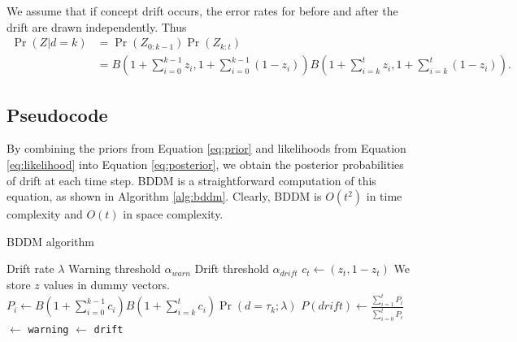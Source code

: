 We assume that if concept drift occurs, the error rates for before and after the drift are drawn independently. Thus
\begin{align}
  \Pr(Z|d=k) &= \Pr(Z_{0:k-1})\Pr(Z_{k:t}) \\
  &= B\left(1+\sum_{i=0}^{k-1} z_i,1+\sum_{i=0}^{k-1} (1-z_i)\right) B\left(1+\sum_{i=k}^t z_i,1+\sum_{i=k}^t (1-z_i)\right). \label{eq:likelihood}
\end{align}

\subsection{Pseudocode}

By combining the priors from Equation \ref{eq:prior} and likelihoods from Equation \ref{eq:likelihood} into Equation \ref{eq:posterior}, we obtain the posterior probabilities of drift at each time step. BDDM is a straightforward computation of this equation, as shown in Algorithm \ref{alg:bddm}. Clearly, BDDM is $O(t^2)$ in time complexity and $O(t)$ in space complexity. %

\begin{algorithm}
    \caption{BDDM algorithm}
    \label{alg:bddm}
    \begin{algorithmic}
        \Require Drift rate $\lambda$
        \Require Warning threshold $\alpha_{warn}$
        \Require Drift threshold $\alpha_{drift}$
          \State $c_t \gets (z_t, 1-z_t)$
          \Comment We store $z$ values in dummy vectors.
            \State $P_i \gets B\left(1+\sum_{i=0}^{k-1}c_i\right) B\left(1+\sum_{i=k}^t c_i\right) \Pr(d=\tau_k;\lambda)$
          \EndFor
          \State $P(drift) \gets \frac{\sum_{i=1}^t P_i}{\sum_{i=0}^t P_i}$
             $\gets$ {\tt warning}
             $\gets$ {\tt drift}
          \EndIf
        \EndFor
    \end{algorithmic}
\end{algorithm}

